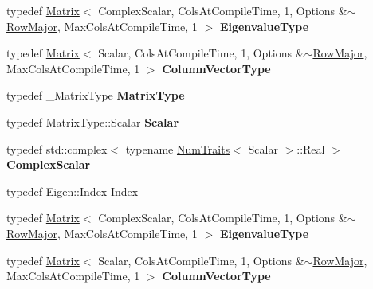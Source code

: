 \begin{DoxyCompactItemize}
\item 
\mbox{\label{group___eigenvalues___module_afbbe25cec217b5e046a5c30ff5cd06a9}} 
typedef \hyperlink{group___core___module_class_eigen_1_1_matrix}{Matrix}$<$ Complex\+Scalar, Cols\+At\+Compile\+Time, 1, Options \&$\sim$\hyperlink{group__enums_ggaacded1a18ae58b0f554751f6cdf9eb13acfcde9cd8677c5f7caf6bd603666aae3}{Row\+Major}, Max\+Cols\+At\+Compile\+Time, 1 $>$ {\bfseries Eigenvalue\+Type}
\item 
\mbox{\label{group___eigenvalues___module_a9881cece39bdf8c3e3cf46358b26dacf}} 
typedef \hyperlink{group___core___module_class_eigen_1_1_matrix}{Matrix}$<$ Scalar, Cols\+At\+Compile\+Time, 1, Options \&$\sim$\hyperlink{group__enums_ggaacded1a18ae58b0f554751f6cdf9eb13acfcde9cd8677c5f7caf6bd603666aae3}{Row\+Major}, Max\+Cols\+At\+Compile\+Time, 1 $>$ {\bfseries Column\+Vector\+Type}
\item 
\mbox{\label{group___eigenvalues___module_a78d0d6fe0e8a689523cf2da3f35abe1d}} 
typedef \+\_\+\+Matrix\+Type {\bfseries Matrix\+Type}
\item 
\mbox{\label{group___eigenvalues___module_a06ae61ee5b81d0539fae804f91cd7acb}} 
typedef Matrix\+Type\+::\+Scalar {\bfseries Scalar}
\item 
\mbox{\label{group___eigenvalues___module_a2788cf1defe2e6a0116f43efba689373}} 
typedef std\+::complex$<$ typename \hyperlink{group___core___module_struct_eigen_1_1_num_traits}{Num\+Traits}$<$ Scalar $>$\+::Real $>$ {\bfseries Complex\+Scalar}
\item 
typedef \hyperlink{namespace_eigen_a62e77e0933482dafde8fe197d9a2cfde}{Eigen\+::\+Index} \hyperlink{group___eigenvalues___module_a6201e534e901b5f4e66f72c176b534a3}{Index}
\item 
\mbox{\label{group___eigenvalues___module_afbbe25cec217b5e046a5c30ff5cd06a9}} 
typedef \hyperlink{group___core___module_class_eigen_1_1_matrix}{Matrix}$<$ Complex\+Scalar, Cols\+At\+Compile\+Time, 1, Options \&$\sim$\hyperlink{group__enums_ggaacded1a18ae58b0f554751f6cdf9eb13acfcde9cd8677c5f7caf6bd603666aae3}{Row\+Major}, Max\+Cols\+At\+Compile\+Time, 1 $>$ {\bfseries Eigenvalue\+Type}
\item 
\mbox{\label{group___eigenvalues___module_a9881cece39bdf8c3e3cf46358b26dacf}} 
typedef \hyperlink{group___core___module_class_eigen_1_1_matrix}{Matrix}$<$ Scalar, Cols\+At\+Compile\+Time, 1, Options \&$\sim$\hyperlink{group__enums_ggaacded1a18ae58b0f554751f6cdf9eb13acfcde9cd8677c5f7caf6bd603666aae3}{Row\+Major}, Max\+Cols\+At\+Compile\+Time, 1 $>$ {\bfseries Column\+Vector\+Type}
\end{DoxyCompactItemize}

